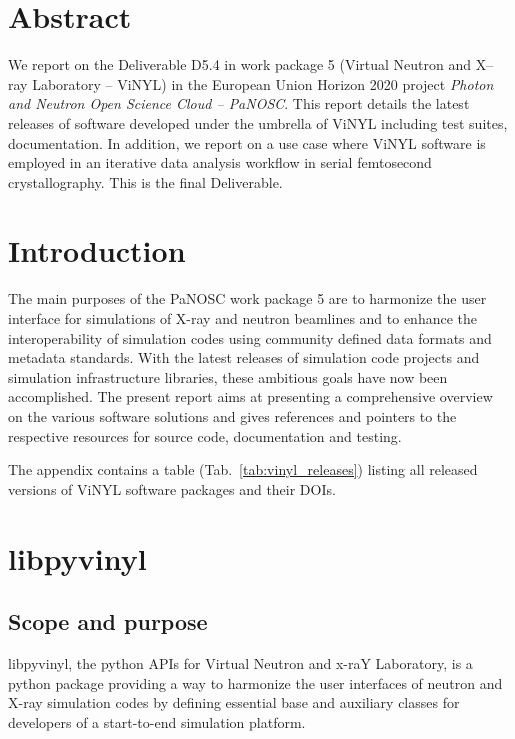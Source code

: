 \documentclass[11pt, a4paper]{article}
\begin{document}
\newpage
{}
\newpage
\tableofcontents
\newpage

\section{Abstract}
We report on the Deliverable D5.4 in work package 5 (Virtual Neutron and X--ray
Laboratory -- ViNYL) in the European Union Horizon 2020 project \emph{Photon
  and Neutron Open Science Cloud -- PaNOSC}. 
This report details the latest releases of  software developed under the umbrella of
ViNYL including test suites, documentation. In addition, we report on a use case
where ViNYL software is employed in an iterative data analysis workflow in serial
femtosecond crystallography. This is the final Deliverable.

\section{Introduction}

The main purposes of the PaNOSC work package 5 are to
harmonize the user interface for simulations of X-ray and neutron beamlines and
to enhance the interoperability of simulation codes using community
defined data formats and metadata standards. With the latest releases of
simulation code projects and simulation infrastructure libraries, these
ambitious
goals have now been accomplished. The present report aims at presenting a
comprehensive
overview on the various software solutions and gives references and pointers to
the respective resources for source code,
documentation and testing.

The appendix contains a table (Tab.~\ref{tab:vinyl_releases}) listing all released versions of ViNYL software packages and their DOIs.

\section{libpyvinyl}
\label{sec:libpyvinyl}


\subsection{Scope and purpose}
\label{sec:lpv_scope}
libpyvinyl, the python APIs for Virtual Neutron and x-raY Laboratory, is a python package providing a way to harmonize the user interfaces of neutron and X-ray simulation codes by defining essential base and auxiliary classes for developers of a start-to-end simulation platform. 
\end{document}
